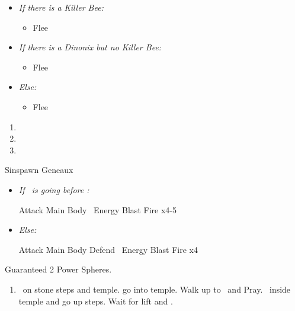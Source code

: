 \begin{encounters}
	\begin{itemize}
		\item \textit{If there is a Killer Bee:}
			\begin{itemize}
				\tidusf Attack a Dinonix if present, else Defend
				\yunaf Defend
				\wakkaf Attack the Killer Bee
				\item Flee
			\end{itemize}
		\item \textit{If there is a Dinonix but no Killer Bee:}
			\begin{itemize}
				\tidusf Defend
				\yunaf Defend
				\wakkaf Attack the Dinonix
				\item Flee
			\end{itemize}
		\item \textit{Else:}
			\begin{itemize}
				\item Flee
			\end{itemize}
	\end{itemize}
\end{encounters}
\begin{enumerate}[resume]
	\item \sd
	\item \formation{\tidus}{\yuna}{\wakka}
	\item \save
\end{enumerate}
\bothvfill\winvfill\lossvfill
\begin{battle}[3000]{Sinspawn Geneaux}
	\begin{itemize}
		\item \textit{If \tidus\ is going before \yuna:}
		      \begin{itemize}
			      \tidusf Attack Main Body
			      \summon{\valefor}
			      \valeforf \od\ Energy Blast
			      \valeforf Fire x4-5
		      \end{itemize}
		\item \textit{Else:}
		      \begin{itemize}
			      \switch{\yuna}{\kimahri}
			      \kimahrif Attack Main Body
			      \tidusf Defend
			      \switch{anyone}{\yuna}
			      \summon{\valefor}
			      \valeforf \od\ Energy Blast
			      \valeforf Fire x4
		      \end{itemize}
	\end{itemize}
Guaranteed 2 Power Spheres.
\end{battle}
\begin{enumerate}[resume]
	\item \sd\ on stone steps and temple. go into temple. Walk up to \wakka\ and Pray. \sd\ inside temple and go up steps. Wait for lift and \sd.
\end{enumerate}
